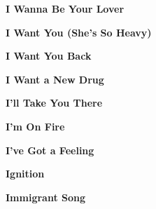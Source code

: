 \newline
\vspace{10pt} 
\begin{center}\textbf{I Wanna Be Your Lover}\end{center}
\newline
\vspace{10pt} 
\begin{center}\textbf{I Want You (She's So Heavy)}\end{center}
\newline
\vspace{10pt} 
\begin{center}\textbf{I Want You Back}\end{center}
\newline
\vspace{10pt} 
\begin{center}\textbf{I Want a New Drug}\end{center}
\newline
\vspace{10pt} 
\begin{center}\textbf{I'll Take You There}\end{center}
\newline
\vspace{10pt} 
\begin{center}\textbf{I'm On Fire}\end{center}
\newline
\vspace{10pt} 
\begin{center}\textbf{I've Got a Feeling}\end{center}
\newline
\vspace{10pt} 
\begin{center}\textbf{Ignition}\end{center}
\newline
\vspace{10pt} 
\begin{center}\textbf{Immigrant Song}\end{center}
\newline
